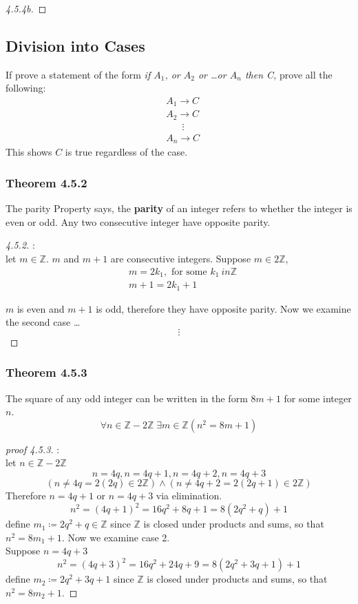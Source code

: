 \documentclass[12pt]{book}
\newcommand{\Z}{\mathbb{Z}}
\newcommand{\paren}[1]{\left( #1 \right)}
\begin{document}
\begin{enumerate}
\begin{proof}[4.5.4b]
            
        \end{proof}

\end{enumerate}

\subsection{Division into Cases}
If prove a statement of the form \textit{if $A_1$, or $A_2$ or \ldots or $A_n$ then C,} prove all the following:
\begin{align*}
    &A_1 \rightarrow C\\
    &A_2 \rightarrow C\\
    &\;\;\;\;\;\; \vdots \\
    &A_n \rightarrow C
\end{align*}
This shows $C$ is true regardless of the case.

\subsubsection{Theorem 4.5.2}
The parity Property says, the \textbf{parity} of an integer refers to whether the integer is even or odd. Any two consecutive integer have opposite parity. 
\begin{proof}[4.5.2]:\\
let $m\in \Z$. $m$ and $m+1$ are consecutive integers. Suppose $m \in 2\Z$,
\begin{align*}
    &m = 2k_1, \text{ for some } k_1 \ in \Z\\
    &m+1 = 2k_1 + 1
\end{align*}

$m$ is even and $m+1$ is odd, therefore they have opposite parity. Now we examine the second case \ldots \\
\[
\vdots
\]
\end{proof}
\newpage
\subsubsection{Theorem 4.5.3}
The square of any odd integer can be written in the form $8m+1$ for some integer $n$.
\[
\forall n \in \Z - 2\Z \; \exists m \in \Z \paren{ n^2 = 8m+1}
\]
\begin{proof}[proof 4.5.3]:\\
let $n \in \Z - 2\Z$\\
\[
n = 4q, n= 4q+1, n=4q+2, n=4q+3
\]
\[
\paren{n\neq 4q = 2(2q) \in 2\Z} \wedge \paren{n \neq 4q + 2 = 2(2q+1) \in 2\Z}
\]
Therefore $n=4q+1$ or $n = 4q+3$ via elimination.
\[
n^2 = (4q+1)^2 = 16q^2 + 8q + 1 = 8\paren{2q^2 + q} + 1 
\]
define $m_1 \coloneqq 2q^2 + q \in \Z$ since $\Z$ is closed under products and sums, so that $n^2 = 8m_1 + 1$. Now we examine case 2.\\
Suppose $n = 4q+3$
\[
n^2 = \paren{4q+3}^2 = 16q^2 + 24q + 9 = 8 \paren{2q^2 + 3q + 1} + 1
\]
define $m_2 \coloneqq 2q^2 + 3q + 1$ since $\Z$ is closed under products and sums, so that $n^2 = 8m_2 + 1$.
\end{proof}
\end{document}
